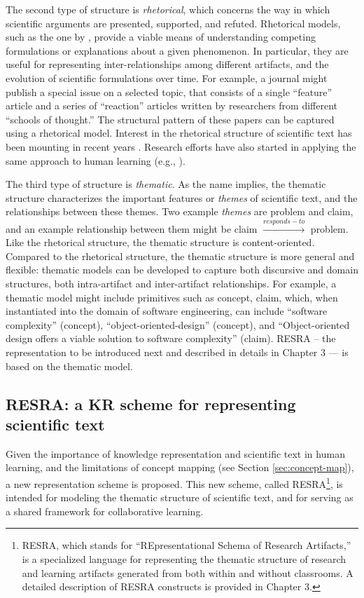 The second type of structure is {\it rhetorical\/}, which concerns the way
in which scientific arguments are presented, supported, and refuted.
Rhetorical models, such as the one by \cite{Toulmin84}, provide a viable
means of understanding competing formulations or explanations about a given
phenomenon. In particular, they are useful for representing
inter-relationships among different artifacts, and the evolution of
scientific formulations over time. For example, a journal might publish a
special issue on a selected topic, that consists of a single ``feature''
article and a series of ``reaction'' articles written by researchers from
different ``schools of thought.'' The structural pattern of these papers
can be captured using a rhetorical model. Interest in the rhetorical
structure of scientific text has been mounting in recent years
\cite{Bazerman88,Selzer93,Simons90}. Research efforts have also started in
applying the same approach to human learning (e.g.,
\cite{Cavalli-Sforza92}).

The third type of structure is {\it thematic\/}. As the name implies, the
thematic structure characterizes the important features or {\it themes\/}
of scientific text, and the relationships between these themes.  Two
example {\it themes\/} are {\sf problem\/} and {\sf claim\/}, and an
example relationship between them might be {\sf claim} \( \stackrel{
responds-to}{\longrightarrow} \) {\sf problem}. Like the rhetorical
structure, the thematic structure is content-oriented. Compared to the
rhetorical structure, the thematic structure is more general and flexible:
thematic models can be developed to capture both discursive and domain
structures, both intra-artifact and inter-artifact relationships.  For
example, a thematic model might include primitives such as {\sf concept\/},
{\sf claim\/}, which, when instantiated into the domain of software
engineering, can include ``software complexity'' ({\sf concept\/}),
``object-oriented-design'' ({\sf concept\/}), and ``Object-oriented design
offers a viable solution to software complexity'' ({\sf claim\/}). RESRA --
the representation to be introduced next and described in details in
Chapter 3 --- is based on the thematic model.


\subsection{RESRA: a KR scheme for representing scientific text}
\label{sec:resra1}

Given the importance of knowledge representation and scientific text in
human learning, and the limitations of concept mapping (see Section
\ref{sec:concept-map}), a new representation scheme is proposed. This new
scheme, called RESRA\footnote{RESRA, which stands for ``REpresentational Schema
of Research Artifacts,'' is a specialized language for representing the
thematic structure of research and learning artifacts generated from both
within and without classrooms. A detailed description of RESRA constructs
is provided in Chapter 3.}, is intended for modeling the thematic structure
of scientific text, and for serving as a shared framework for collaborative
learning.


